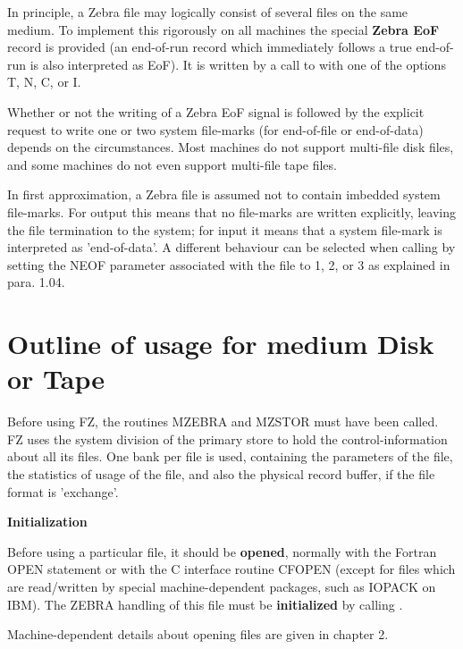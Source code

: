 In principle, a Zebra file may logically consist of several
files on the same medium.
To implement this rigorously on all machines the special
\textbf{Zebra EoF} record is provided
(an end-of-run record which immediately follows a true end-of-run
is also interpreted as EoF).
It is written by a call to  with one of the options
T, N, C, or I.

Whether or not the writing of a Zebra EoF signal is followed
by the explicit request to write one or two system file-marks
(for end-of-file or end-of-data)
depends on the circumstances.
Most machines do not support multi-file disk files,
and some machines do not even support multi-file tape files.

In first approximation, a Zebra file is assumed not to
contain imbedded system file-marks.
For output this means that no file-marks are written explicitly,
leaving the file termination to the system;
for input it means that a system file-mark is interpreted
as 'end-of-data'.
A different behaviour can be selected when calling 
by setting the NEOF parameter associated with the file
to 1, 2, or 3  as explained in para. 1.04.

\section{Outline of usage for medium Disk or Tape}

Before using FZ, the routines MZEBRA and MZSTOR must have
been called.
FZ uses the system division of the primary store to hold
the control-information about all its files.
One bank per file is used, containing the parameters of the file,
the statistics of usage of the file,
and also the physical record buffer,
if the file format is 'exchange'.

{\large\bf Initialization}

Before using a particular file,
it should be \textbf{opened},
normally with the Fortran OPEN statement
or with the C interface routine CFOPEN
(except for files which are read/written by special
machine-dependent packages, such as IOPACK on IBM).
The ZEBRA handling of this file must be \textbf{initialized}
by calling .

Machine-dependent details about opening files are given in chapter 2.

